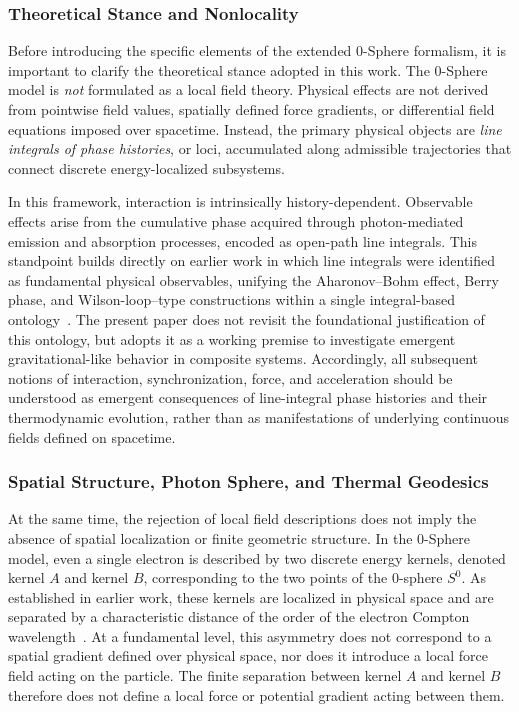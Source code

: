 \documentclass[
 reprint,
 amsmath,amssymb,
 aps,
 prb,
]{revtex4-2}
\numberwithin{equation}{section}
\begin{document}
\subsubsection{Theoretical Stance and Nonlocality}

Before introducing the specific elements of the extended 0-Sphere formalism, it is important to clarify the theoretical stance adopted in this work. The 0-Sphere model is \emph{not} formulated as a local field theory. Physical effects are not derived from pointwise field values, spatially defined force gradients, or differential field equations imposed over spacetime. Instead, the primary physical objects are \emph{line integrals of phase histories}, or loci, accumulated along admissible trajectories that connect discrete energy-localized subsystems.

In this framework, interaction is intrinsically history-dependent. Observable effects arise from the cumulative phase acquired through photon-mediated emission and absorption processes, encoded as open-path line integrals. This standpoint builds directly on earlier work in which line integrals were identified as fundamental physical observables, unifying the Aharonov--Bohm effect, Berry phase, and Wilson-loop--type constructions within a single integral-based ontology~\cite{Hanamura2026Trilogy3}. The present paper does not revisit the foundational justification of this ontology, but adopts it as a working premise to investigate emergent gravitational-like behavior in composite systems. Accordingly, all subsequent notions of interaction, synchronization, force, and acceleration should be understood as emergent consequences of line-integral phase histories and their thermodynamic evolution, rather than as manifestations of underlying continuous fields defined on spacetime.

\subsubsection{Spatial Structure, Photon Sphere, and Thermal Geodesics}

At the same time, the rejection of local field descriptions does not imply the absence of spatial localization or finite geometric structure. In the 0-Sphere model, even a single electron is described by two discrete energy kernels, denoted kernel $A$ and kernel $B$, corresponding to the two points of the 0-sphere $S^{0}$. As established in earlier work, these kernels are localized in physical space and are separated by a characteristic distance of the order of the electron Compton wavelength~\cite{Hanamura2026Trilogy3}. At a fundamental level, this asymmetry does not correspond to a spatial gradient defined over physical space, nor does it introduce a local force field acting on the particle. The finite separation between kernel $A$ and kernel $B$ therefore does not define a local force or potential gradient acting between them.
\end{document}
